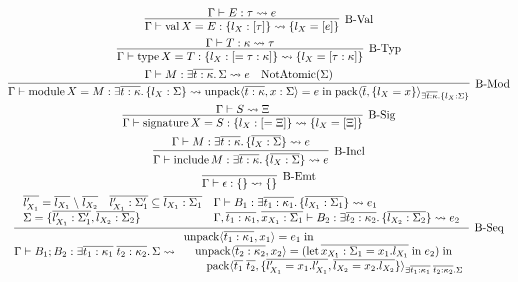 \begin{gather*}
  \infer[\text{B-Val}]{\Gamma \vdash \symval X = E: \{l_X: [\tau]\} \elaborate \{l_X = [e]\}}{
    \Gamma \vdash E: \tau \elaborate e
  }
  \\
  \infer[\text{B-Typ}]{\Gamma \vdash \symtype X = T: \{l_X: [= \tau: \kappa]\} \elaborate \{l_X = [\tau: \kappa]\}}{
    \Gamma \vdash T: \kappa \elaborate \tau
  }
  \\
  \infer[\text{B-Mod}]{\Gamma \vdash \symmodule X = M: \exists \overline{t: \kappa}\ldotp \{l_X: \Sigma\} \elaborate \symunpack\langle \overline{t: \kappa}, x: \Sigma\rangle = e \symin \sympack\langle \overline{t}, \{l_X = x\}\rangle_{\exists \overline{t: \kappa}\ldotp \{l_X: \Sigma\}}}{
    \Gamma \vdash M: \exists \overline{t: \kappa}\ldotp \Sigma \elaborate e
    &
    \symNotAtomic(\Sigma)
  }
  \\
  \infer[\text{B-Sig}]{\Gamma \vdash \symsignature X = S: \{l_X: [= \Xi]\} \elaborate \{l_X = [\Xi]\}}{
    \Gamma \vdash S \elaborate \Xi
  }
  \\
  \infer[\text{B-Incl}]{\Gamma \vdash \syminclude M: \exists \overline{t: \kappa}\ldotp \{\overline{l_X: \Sigma}\} \elaborate e}{
    \Gamma \vdash M: \exists \overline{t: \kappa}\ldotp \{\overline{l_X: \Sigma}\} \elaborate e
  }
  \\
  \infer[\text{B-Emt}]{\Gamma \vdash \epsilon: \{\} \elaborate \{\}}{}
  \\
  \infer[\text{B-Seq}]{
    \Gamma \vdash B_1; B_2: \exists \overline{t_1: \kappa_1}\; \overline{t_2: \kappa_2}\ldotp \Sigma \elaborate
    \begin{array}{l}
      \symunpack\langle \overline{t_1: \kappa_1}, x_1\rangle = e_1 \symin \\
      \hspace{1em}\symunpack\langle \overline{t_2: \kappa_2}, x_2\rangle = (\symlet \overline{x_{X_1}: \Sigma_1 = x_1.l_{X_1}} \symin e_2) \symin \\
      \hspace{2em}\sympack\langle \overline{t_1}\; \overline{t_2}, \{\overline{l'_{X_1} = x_1.l'_{X_1}}, \overline{l_{X_2} = x_2.l_{X_2}}\}\rangle_{
        \exists \overline{t_1: \kappa_1}\; \overline{t_2: \kappa_2}\ldotp \Sigma
      }
    \end{array}
  }{
    \begin{array}{lll}
      \overline{l'_{X_1}} = \overline{l_{X_1}} \rcomplement \overline{l_{X_2}}
      &
      \overline{l'_{X_1}: \Sigma'_1} \subseteq \overline{l_{X_1}: \Sigma_1}
      &
      \Gamma \vdash B_1: \exists \overline{t_1: \kappa_1}\ldotp \{\overline{l_{X_1}: \Sigma_1}\} \elaborate e_1
      \\
      \multicolumn{2}{l}{\Sigma = \{\overline{l'_{X_1}: \Sigma'_1}, \overline{l_{X_2}: \Sigma_2}\}}
      &
      \Gamma, \overline{t_1: \kappa_1}, \overline{x_{X_1}: \Sigma_1} \vdash B_2: \exists \overline{t_2: \kappa_2}\ldotp \{\overline{l_{X_2}: \Sigma_2}\} \elaborate e_2
    \end{array}
  }
\end{gather*}

